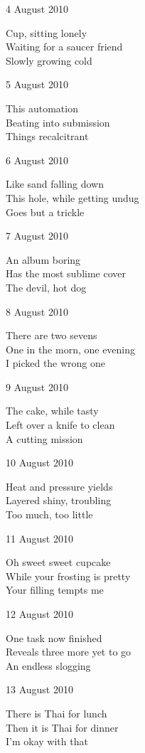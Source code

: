 \documentclass[12pt]{article}
\begin{document}
\newpage

4 August 2010

Cup, sitting lonely \\
Waiting for a saucer friend \\
Slowly growing cold

5 August 2010

This automation \\
Beating into submission \\
Things recalcitrant

6 August 2010

Like sand falling down \\
This hole, while getting undug \\
Goes but a trickle

7 August 2010

An album boring \\
Has the most sublime cover \\
The devil, hot dog

8 August 2010

There are two sevens \\
One in the morn, one evening \\
I picked the wrong one

9 August 2010

The cake, while tasty \\
Left over a knife to clean \\
A cutting mission

10 August 2010

Heat and pressure yields \\
Layered shiny, troubling \\
Too much, too little


\newpage

11 August 2010

Oh sweet sweet cupcake \\
While your frosting is pretty \\
Your filling tempts me

12 August 2010

One task now finished \\
Reveals three more yet to go \\
An endless slogging

13 August 2010

There is Thai for lunch \\
Then it is Thai for dinner \\
I'm okay with that
\end{document}

